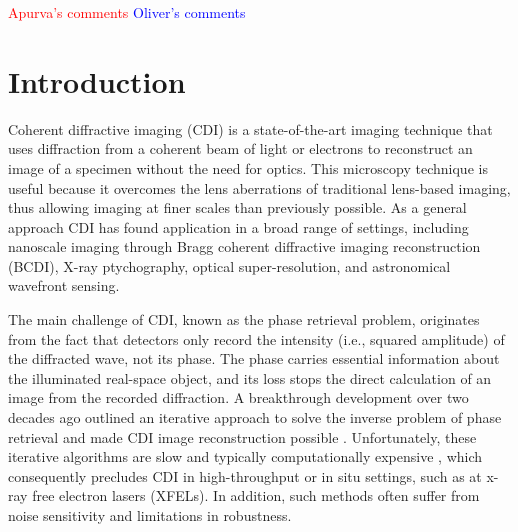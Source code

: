 \documentclass[sn-mathphys]{sn-jnl}%
\theoremstyle{thmstyleone}%
\theoremstyle{thmstyletwo}%
\theoremstyle{thmstylethree}%
\begin{document}
\maketitle


\textcolor{red}{Apurva's comments}
\textcolor{blue}{Oliver's comments}
\section{Introduction }\label{sec1}
Coherent diffractive imaging (CDI) is a state-of-the-art imaging technique that uses diffraction from a coherent beam of light or electrons to reconstruct an image of a specimen without the need for optics. This microscopy technique is useful because it overcomes the lens aberrations of traditional lens-based imaging, thus allowing imaging at finer scales than previously possible. As a general approach CDI has found application in a broad range of settings, including nanoscale imaging through Bragg coherent diffractive imaging reconstruction (BCDI), X-ray ptychography, optical super-resolution, and astronomical wavefront sensing. \cite{dean2006phase, heintzmann2021answers, miao2015beyond}

The main challenge of CDI, known as the phase retrieval problem, originates from the fact that detectors only record the intensity (i.e., squared amplitude) of the diffracted wave, not its phase. The phase carries essential information about the illuminated real-space object, and its loss stops the direct calculation of an image from the recorded diffraction. A breakthrough development over two decades ago outlined an iterative approach to solve the inverse problem of phase retrieval and made CDI image reconstruction possible \cite{miao1999extending}. Unfortunately, these iterative algorithms are slow and typically computationally expensive \cite{epie}, which consequently precludes CDI in high-throughput or in situ settings, such as at x-ray free electron lasers (XFELs). In addition, such methods often suffer from noise sensitivity and limitations in robustness.
\end{document}
